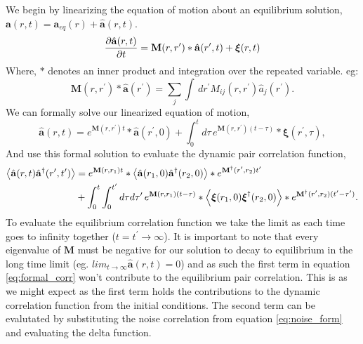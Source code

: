 We begin by linearizing the equation of motion about an equilibrium solution,
$\mathbf{a}(r, t) = \mathbf{a}_{eq}(r) + \hat{\mathbf{a}}(r, t)$.
%
\begin{equation}
    \frac{\partial \hat{\mathbf{a}} (r, t)}{\partial t} =
        \mathbf{M}(r, r^\prime) \ast \hat{\mathbf{a}}(r^\prime, t) +
\boldsymbol{\xi}(r, t) 
\end{equation}
%
Where, $\ast$ denotes an inner product and integration over the repeated
variable. eg:
%
\begin{equation}
    \mathbf{M}(r, r^\prime)\ast \hat{\mathbf{a}}(r^\prime) =
\sum_j \int\,dr^\prime M_{ij}(r, r^\prime) \hat{a}_j(r^\prime).
\end{equation}
%
We can formally solve our linearized equation of motion,
%
\begin{equation}
    \label{eq:formal_sol}
    \hat{\mathbf{a}}(r, t) = e^{\mathbf{M}(r,
r^\prime)t}\ast\hat{\mathbf{a}}(r^\prime, 0) + \int_0^t d\tau\,
e^{\mathbf{M}(r, r^\prime)(t-\tau)} \ast \boldsymbol{\xi} (r^\prime, \tau),
\end{equation}
%
And use this formal solution to evaluate the dynamic pair correlation function,
%
\begin{align} 
    \label{eq:formal_corr}
    \left\langle \hat{\mathbf{a}}(r,t)\hat{\mathbf{a}}^\dagger(r^\prime, t^\prime) \right\rangle &=
             e^{\mathbf{M}(r, r_1)t}
        \ast \left\langle \hat{\mathbf{a}}(r_1, 0)\hat{\mathbf{a}}^\dagger(r_2, 0) \right\rangle
        \ast e^{\mathbf{M}^\dagger(r^\prime, r_2)t^\prime} \nonumber \\ 
     &+ \int_0^t \int_0^{t^\prime}d\tau d\tau^\prime\, 
        e^{\mathbf{M}(r, r_1)(t-\tau)} 
        \ast \left\langle  \boldsymbol{\xi}(r_1, 0)\boldsymbol{\xi}^\dagger(r_2, 0) \right\rangle
        \ast e^{\mathbf{M}^\dagger(r^\prime, r_2)(t^\prime-\tau^\prime)}.
\end{align}
%
To evaluate the equilibrium correlation function we take the limit as each time
goes to infinity together ($t = t^\prime \rightarrow \infty$). It is important
to note that every eigenvalue of $\mathbf{M}$ must be negative for our solution
to decay to equilibrium in the long time limit (eg.
$lim_{t\rightarrow\infty}\hat{\mathbf{a}}(r, t) = 0$) and as such the first
term in equation \ref{eq:formal_corr} won't contribute to the equilibrium
pair correlation. This is as we might expect as the first term holds the
contributions to the dynamic correlation function from the initial conditions.
The second term can be evalutated by substituting the noise correlation from
equation \ref{eq:noise_form} and
evaluating the delta function.
